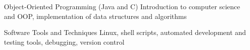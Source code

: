 

\begin{cvskills}

  \cvskill
    {Object-Oriented Programming (Java and C)} %
    {Introduction to computer science and OOP, implementation of data structures and algorithms} %
    
  \cvskill
    {Software Tools and Techniques} %
    {Linux, shell scripts, automated development and testing tools, debugging, version control} %


\end{cvskills}
